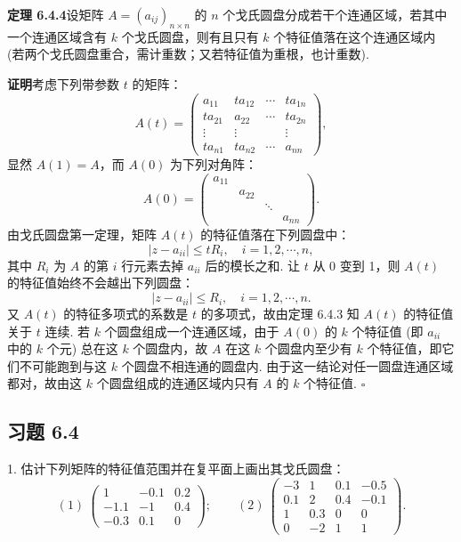 \documentclass[UTF8, 12pt, fontset=fandol, oneside]{ctexart}
\begin{document}
\noindent\textbf{定理 6.4.4}\quad 设矩阵 $A=(a_{ij})_{n\times n}$ 的 $n$ 个戈氏圆盘分成若干个连通区域，若其中一个连通区域含有 $k$ 个戈氏圆盘，则有且只有 $k$ 个特征值落在这个连通区域内 (若两个戈氏圆盘重合，需计重数；又若特征值为重根，也计重数).

\noindent\textbf{证明}\quad 考虑下列带参数 $t$ 的矩阵：
\[
A(t)=\left(\begin{array}{cccc}
a_{11} & ta_{12} & \cdots & ta_{1n}\\
ta_{21} & a_{22} & \cdots & ta_{2n}\\
\vdots & \vdots & & \vdots\\
ta_{n1} & ta_{n2} & \cdots & a_{nn}
\end{array}\right),
\]
显然 $A(1)=A$，而 $A(0)$ 为下列对角阵：
\[
A(0)=\left(\begin{array}{cccc}
a_{11} & & & \\
& a_{22} & & \\
& & \ddots & \\
& & & a_{nn}
\end{array}\right).
\]
由戈氏圆盘第一定理，矩阵 $A(t)$ 的特征值落在下列圆盘中：
\[
|z-a_{ii}|\leq tR_i,\quad i=1,2,\cdots,n,
\]
其中 $R_i$ 为 $A$ 的第 $i$ 行元素去掉 $a_{ii}$ 后的模长之和. 让 $t$ 从 0 变到 1，则 $A(t)$ 的特征值始终不会越出下列圆盘：
\[
|z-a_{ii}|\leq R_i,\quad i=1,2,\cdots,n.
\]
又 $A(t)$ 的特征多项式的系数是 $t$ 的多项式，故由定理 6.4.3 知 $A(t)$ 的特征值关于 $t$ 连续. 若 $k$ 个圆盘组成一个连通区域，由于 $A(0)$ 的 $k$ 个特征值 (即 $a_{ii}$ 中的 $k$ 个元) 总在这 $k$ 个圆盘内，故 $A$ 在这 $k$ 个圆盘内至少有 $k$ 个特征值，即它们不可能跑到与这 $k$ 个圆盘不相连通的圆盘内. 由于这一结论对任一圆盘连通区域都对，故由这 $k$ 个圆盘组成的连通区域内只有 $A$ 的 $k$ 个特征值. $\square$

\subsection*{习题 6.4}

1. 估计下列矩阵的特征值范围并在复平面上画出其戈氏圆盘：
\[
(1)\ \left(\begin{array}{rrr}
1 & -0.1 & 0.2\\
-1.1 & -1 & 0.4\\
-0.3 & 0.1 & 0
\end{array}\right);\qquad
(2)\ \left(\begin{array}{rrrr}
-3 & 1 & 0.1 & -0.5\\
0.1 & 2 & 0.4 & -0.1\\
1 & 0.3 & 0 & 0\\
0 & -2 & 1 & 1
\end{array}\right).
\]
\end{document}
